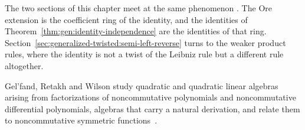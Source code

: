 The two sections of this chapter meet at the same phenomenon
\cite[p.~172]{ChuangLee2010Higher}. The Ore extension is the coefficient
ring of the identity, and the identities of
Theorem~\ref{thm:gen:identity-independence} are the identities of that ring.
Section~\ref{sec:generalized-twisted:semi-left-reverse} turns to the weaker
product rules, where the identity is not a twist of the Leibniz rule but a
different rule altogether.

Gel'fand, Retakh and Wilson study quadratic and quadratic linear algebras arising from factorizations of noncommutative polynomials and noncommutative differential polynomials, algebras that carry a natural derivation, and relate them to noncommutative symmetric functions~\cite{WlQuadraticLinearAlgebrasAssocia2001}.
